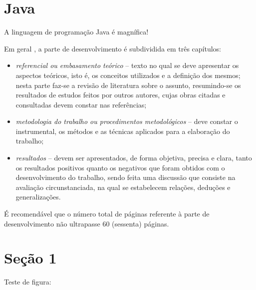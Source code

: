 \documentclass[
	12pt,			%
	openright,		%
	oneside,	
	a4paper,		%
	english,		%
	brazil			%
]{abntex2/abntex2}  %
\begin{document}
	\section{Java}
	
	A linguagem de programação Java \cite{java} é magnífica!

	Em geral \cite{ibge1993}, a parte de desenvolvimento é subdividida em três capítulos:

	\begin{itemize}
		\item \textit{referencial ou embasamento teórico} – texto no qual se deve apresentar os aspectos teóricos, isto é, os conceitos utilizados e a definição dos mesmos; nesta parte faz-se a revisão de literatura sobre o assunto, resumindo-se os resultados de estudos feitos por outros autores, cujas obras citadas e consultadas devem constar nas referências;
	
		\item \textit{metodologia do trabalho ou procedimentos metodológicos} – deve constar o instrumental, os métodos e as técnicas aplicados para a elaboração do trabalho;
	
		\item \textit{resultados} – devem ser apresentados, de forma objetiva, precisa e clara, tanto os resultados positivos quanto os negativos que foram obtidos com o desenvolvimento do trabalho, sendo feita uma discussão que consiste na avaliação circunstanciada, na qual se estabelecem relações, deduções e generalizações.
	\end{itemize}

	É recomendável que o número total de páginas referente à parte de desenvolvimento não ultrapasse 60 (sessenta) páginas.

	\section{Seção 1}

		Teste de figura:
\end{document}

